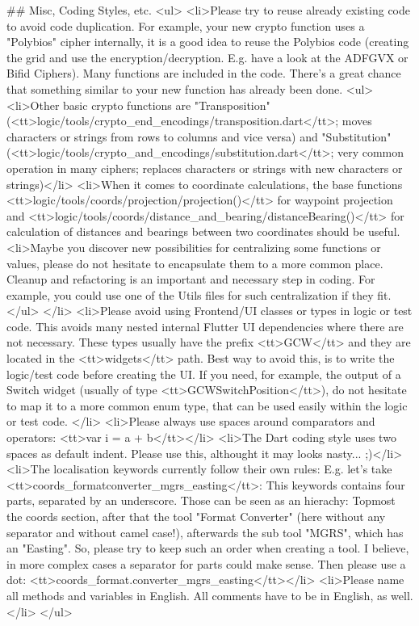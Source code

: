 ## Misc, Coding Styles, etc.
<ul>
	<li>Please try to reuse already existing code to avoid code duplication. For example, your new crypto function uses a "Polybios" cipher internally, it is a good idea to reuse the Polybios code (creating the grid and use the encryption/decryption. E.g. have a look at the ADFGVX or Bifid Ciphers). Many functions are included in the code. There's a great chance that something similar to your new function has already been done.
		<ul><li>Other basic crypto functions are "Transposition" (<tt>logic/tools/crypto_end_encodings/transposition.dart</tt>; moves characters or strings from rows to columns and vice versa) and "Substitution" (<tt>logic/tools/crypto_and_encodings/substitution.dart</tt>; very common operation in many ciphers; replaces characters or strings with new characters or strings)</li>
			<li>When it comes to coordinate calculations, the base functions <tt>logic/tools/coords/projection/projection()</tt> for waypoint projection and <tt>logic/tools/coords/distance_and_bearing/distanceBearing()</tt> for calculation of distances and bearings between two coordinates should be useful.
			<li>Maybe you discover new possibilities for centralizing some functions or values, please do not hesitate to encapsulate them to a more common place. Cleanup and refactoring is an important and necessary step in coding. For example, you could use one of the Utils files for such centralization if they fit.
		</ul>
	</li>
	<li>Please avoid using Frontend/UI classes or types in logic or test code. This avoids many nested internal Flutter UI dependencies where there are not necessary. These types usually have the prefix <tt>GCW</tt> and they are located in the <tt>widgets</tt> path. Best way to avoid this, is to write the logic/test code before creating the UI. If you need, for example, the output of a Switch widget (usually of type <tt>GCWSwitchPosition</tt>), do not hesitate to map it to a more common enum type, that can be used easily within the logic or test code.
	</li>
	<li>Please always use spaces around comparators and operators: <tt>var i = a + b</tt></li>
	<li>The Dart coding style uses two spaces as default indent. Please use this, althought it may looks nasty... ;)</li>
	<li>The localisation keywords currently follow their own rules: E.g. let's take <tt>coords_formatconverter_mgrs_easting</tt>: This keywords contains four parts, separated by an underscore. Those can be seen as an hierachy: Topmost the coords section, after that the tool "Format Converter" (here without any separator and without camel case!), afterwards the sub tool "MGRS", which has an "Easting". So, please try to keep such an order when creating a tool. I believe, in more complex cases a separator for parts could make sense. Then please use a dot: <tt>coords_format.converter_mgrs_easting</tt></li>
	<li>Please name all methods and variables in English. All comments have to be in English, as well.</li>
</ul>